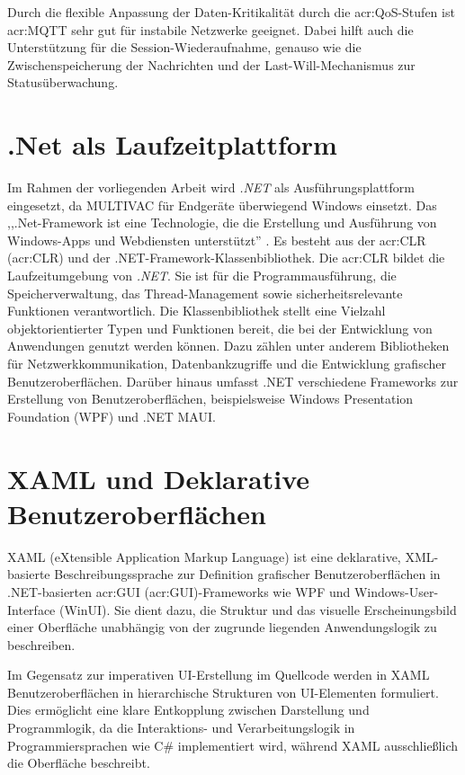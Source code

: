         Durch die flexible Anpassung der Daten-Kritikalität durch die \acrshort{acr:QoS}-Stufen ist \acrshort{acr:MQTT} sehr gut für instabile Netzwerke geeignet. Dabei hilft auch die Unterstützung 
für die Session-Wiederaufnahme, genauso wie die Zwischenspeicherung der Nachrichten und der Last-Will-Mechanismus zur Statusüberwachung. \autocite[73--74]{IoTMQTT}


    
  \section{.Net als Laufzeitplattform}
  Im Rahmen der vorliegenden Arbeit wird \textit{.NET} als Ausführungsplattform eingesetzt, da MULTIVAC für Endgeräte überwiegend Windows einsetzt. Das ,,.Net-Framework ist eine Technologie, die die Erstellung und Ausführung von Windows-Apps und Webdiensten unterstützt'' \autocite{gewarrenUebersichtUeberNET}.  Es besteht aus der \acrlong{acr:CLR} (\acrshort{acr:CLR}) und der .NET-Framework-Klassenbibliothek. 
 Die \acrshort{acr:CLR} bildet die Laufzeitumgebung von \textit{.NET}. Sie ist für die Programmausführung, die Speicherverwaltung, das Thread-Management sowie sicherheitsrelevante Funktionen verantwortlich.
Die Klassenbibliothek stellt eine Vielzahl objektorientierter Typen und Funktionen bereit, die bei der Entwicklung von Anwendungen genutzt werden können. Dazu zählen unter anderem Bibliotheken für Netzwerkkommunikation, Datenbankzugriffe und die Entwicklung grafischer Benutzeroberflächen. Darüber hinaus umfasst .NET verschiedene Frameworks zur Erstellung von Benutzeroberflächen, beispielsweise Windows Presentation Foundation (WPF) und .NET MAUI. \autocite{gewarrenUebersichtUeberNET}
  
\section{XAML und Deklarative Benutzeroberflächen}
    XAML (eXtensible Application Markup Language) ist eine deklarative, XML-basierte Beschreibungssprache zur Definition grafischer Benutzeroberflächen in 
    .NET-basierten \acrlong{acr:GUI} (\acrshort{acr:GUI})-Frameworks wie WPF und Windows-User-Interface (WinUI). Sie dient dazu, die Struktur und das visuelle Erscheinungsbild einer Oberfläche unabhängig von der zugrunde 
    liegenden Anwendungslogik zu beschreiben. \autocite[Vgl.][17--18]{wegenerWPF45Und2012}
    
    Im Gegensatz zur imperativen UI-Erstellung im Quellcode werden in XAML Benutzeroberflächen in hierarchische Strukturen von UI-Elementen formuliert. 
    Dies ermöglicht eine klare Entkopplung zwischen Darstellung und Programmlogik, da die Interaktions- und Verarbeitungslogik in Programmiersprachen wie C\# implementiert wird, 
    während XAML ausschließlich die Oberfläche beschreibt. \autocite[17--18]{wegenerWPF45Und2012}
    
